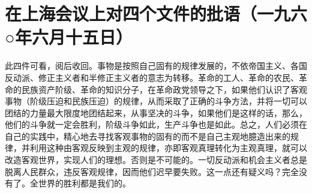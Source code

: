 \section[在上海会议上对四个文件的批语（一九六○年六月十五日）]{在上海会议上对四个文件的批语（一九六○年六月十五日）}


此四件可看，阅后收回。事物是按照自己固有的规律发展的，不依帝国主义、各国反动派、修正主义者和半修正主义者的意志为转移。革命的工人、革命的农民、革命的民族资产阶级、革命的知识分子，在革命政党领导之下，如果他们认识了客观事物（阶级压迫和民族压迫）的规律，从而采取了正确的斗争方法，并将一切可以团结的力量最大限度地团结起来，从事坚决的斗争，如果他们是这样的话，那么，他们的斗争就一定会胜利，阶级斗争如此，生产斗争也是如此。总之，人们必须在自己的实践中，精心地去寻找客观事物的固有的而不是自己主观地臆造出来的规律，并利用这种由客观反映到主观的规律，亦即客观真理转化为主观真理，就可以改造客观世界，实现人们的理想。否则是不可能的。一切反动派和机会主义者总是脱离人民群众，违反客观规律，因而他们迟早要失败。这一点还有疑义吗？完全没有了。全世界的胜利都是我们的。


